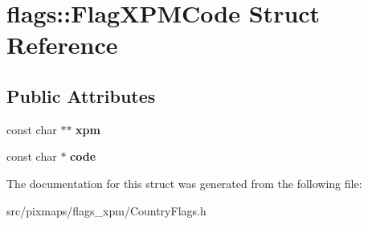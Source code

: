 \section{flags::FlagXPMCode Struct Reference}
\label{structflags_1_1FlagXPMCode}
\subsection*{Public Attributes}
\begin{DoxyCompactItemize}
\item 
const char $\ast$$\ast$ {\bfseries xpm}\label{structflags_1_1FlagXPMCode_a43e125313c1b34685832aa8834313cac}

\item 
const char $\ast$ {\bfseries code}\label{structflags_1_1FlagXPMCode_abdd778533fd136fdfad746e5992cbfb0}

\end{DoxyCompactItemize}


The documentation for this struct was generated from the following file:\begin{DoxyCompactItemize}
\item 
src/pixmaps/flags\_\-xpm/CountryFlags.h\end{DoxyCompactItemize}

